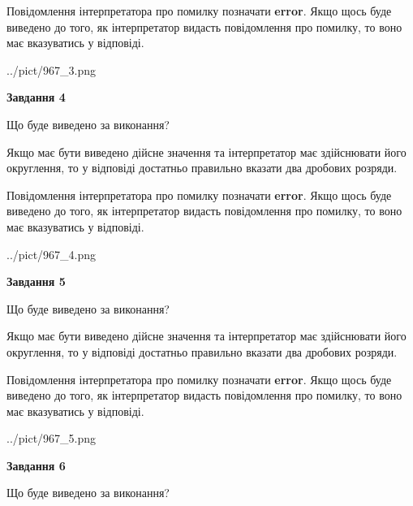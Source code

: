 \documentclass[12pt, ukrainian]{article}
\begin{document}
{\begin {Large}
Повідомлення інтерпретатора про помилку позначати \textbf{error}.
Якщо щось буде виведено до того, як інтерпретатор видасть повідомлення про помилку, 
то воно має вказуватись у відповіді. \par

\begin{center}
	{../pict/967_3.png}
\end{center}
\newpage

{\begin {center}\textbf{Завдання 4}\end {center}}\par
Що буде виведено за виконання? \par

Якщо має бути виведено дійсне значення та інтерпретатор має здійснювати його округлення, 
то у відповіді достатньо правильно вказати два дробових розряди.

Повідомлення інтерпретатора про помилку позначати \textbf{error}.
Якщо щось буде виведено до того, як інтерпретатор видасть повідомлення про помилку, 
то воно має вказуватись у відповіді. \par

\begin{center}
	{../pict/967_4.png}
\end{center}
\newpage

{\begin {center}\textbf{Завдання 5}\end {center}}\par
Що буде виведено за виконання? \par

Якщо має бути виведено дійсне значення та інтерпретатор має здійснювати його округлення, 
то у відповіді достатньо правильно вказати два дробових розряди.

Повідомлення інтерпретатора про помилку позначати \textbf{error}.
Якщо щось буде виведено до того, як інтерпретатор видасть повідомлення про помилку, 
то воно має вказуватись у відповіді. \par

\begin{center}
	{../pict/967_5.png}
\end{center}
\newpage

{\begin {center}\textbf{Завдання 6}\end {center}}\par
Що буде виведено за виконання? \par


\end{Large}}
\end{document}

